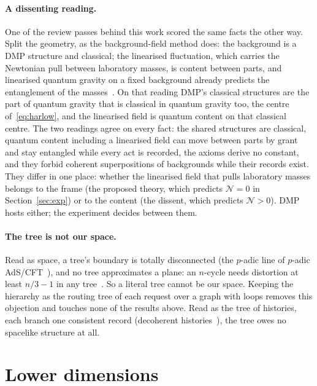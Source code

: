 \documentclass[11pt,a4paper]{article}
\theoremstyle{definition}
\theoremstyle{remark}
\theoremstyle{definition}
\begin{document}
\paragraph{A dissenting reading.} One of the review passes behind this work scored the same facts the other way. Split the geometry, as the
background-field method does: the background is a DMP structure and classical; the linearised fluctuation, which carries the Newtonian
pull between laboratory masses, is content between parts, and linearised quantum gravity on a fixed background already predicts the
entanglement of the masses~\cite{christodoulou23}. On that reading DMP's classical structures are the part of quantum gravity that is
classical in quantum gravity too, the centre of~\eqref{eq:harlow}, and the linearised field is quantum content on that classical
centre. The two readings agree on every fact: the shared structures are classical, quantum content including a linearised field can
move between parts by grant and stay entangled while every act is recorded, the axioms derive no constant, and they forbid coherent
superpositions of backgrounds while their records exist. They differ in one place: whether the linearised field that pulls laboratory
masses belongs to the frame (the proposed theory, which predicts $\mathcal N=0$ in Section~\ref{sec:exp}) or to the content (the dissent,
which predicts $\mathcal N>0$). DMP hosts either; the experiment decides between them.

\paragraph{The tree is not our space.} Read as space, a tree's boundary is totally disconnected (the $p$-adic line of $p$-adic
AdS/CFT~\cite{hmss,gubser}), and no tree approximates a plane: an $n$-cycle needs distortion at least $n/3-1$ in any tree~\cite{rr}. So a
literal tree cannot be our space. Keeping the hierarchy as the routing tree of each request over a graph with loops removes this objection
and touches none of the results above. Read as the tree of histories, each branch one consistent record (decoherent
histories~\cite{gellmannhartle}), the tree owes no spacelike structure at all.

\section{Lower dimensions}\label{sec:21}
\end{document}
